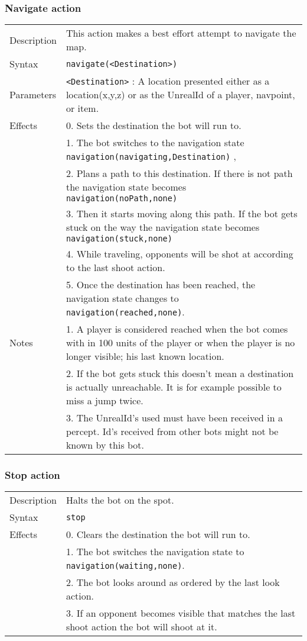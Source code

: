 \documentclass[11pt,a4paper]{article}
\begin{document}
\subsubsection*{Navigate action}

\begin{small}
\begin{tabular}{p{2cm}p{9cm}}
Description & This action makes a best effort attempt to navigate the map. \\
Syntax & \verb|navigate(<Destination>)|\\
Parameters & \verb|<Destination>| : A location presented either as a location(x,y,z) or as the UnrealId of a player, navpoint, or item. \\
Effects &	0. Sets the destination the bot will run to.\\
	 & 	1. The bot switches to the navigation state  \verb|navigation(navigating,Destination)| ,\\ 
	&	2. Plans a path to this destination. If there is not path the navigation state becomes \verb|navigation(noPath,none)|\\
	&	3. Then it starts moving along this path. If the bot gets stuck on the way the navigation state becomes \verb|navigation(stuck,none)| \\
	&	4. While traveling, opponents will be shot at according to the last shoot action.\\
	&	5. Once the destination has been reached, the navigation state changes to \verb|navigation(reached,none)|.\\
Notes & 	1. A player is considered reached when the bot comes with in 100 units of the player or when the player is no longer visible; his last known location.  \\
	&	2. If the bot gets stuck this doesn't mean a destination is actually unreachable. It is for example possible to miss a jump twice.\\
	& 	3. The UnrealId's used must have been received in a percept. Id's received from other bots might not be known by this bot. \\

\end{tabular}
\end{small}

\subsubsection*{Stop action}
\begin{small}
\begin{tabular}{p{2cm}p{9cm}}
Description & Halts the bot on the spot.\\ 
Syntax & \verb|stop|\\
Effects 
	&	0.	Clears the destination the bot will run to. \\
	&	1.	The bot switches the navigation state to \verb|navigation(waiting,none)|. \\
	&	2.	The bot looks around as ordered by the last look action.\\
	&	3.	If an opponent becomes visible that matches the last shoot action the bot will shoot at it.
\end{tabular}
\end{small}
\end{document}
